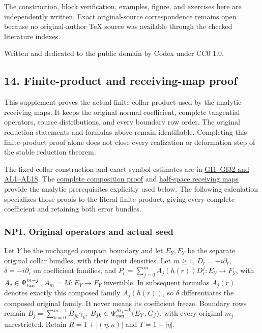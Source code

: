 \documentclass[
  11pt,
]{article}
\begin{document}
The construction, block verification, examples, figure, and exercises
here are independently written. Exact original-source correspondence
remains open because no original-author TeX source was available through
the checked literature indexes.

Written and dedicated to the public domain by Codex under CC0 1.0.

\subsection{14. Finite-product and receiving-map
proof}\label{finite-product-receiving-proof}

This supplement proves the actual finite collar product used by the
analytic receiving maps. It keeps the original normal coefficient,
complete tangential operators, source distributions, and every boundary
row order. The original reduction statements and formulas above remain
identifiable. Completing this finite-product proof alone does not close
every realization or deformation step of the stable reduction theorem.

The fixed-collar construction and exact symbol estimates are in
\href{generalized-collar-fredholm.pdf\#section*.90}{GI1--GI32
and AL1--AL18}. The
\href{generalized-collar-fredholm.pdf\#section*.208}{complete
composition proof} and
\href{generalized-collar-fredholm.pdf\#section*.249}{half-space
receiving maps} provide the analytic prerequisites explicitly used
below. The following calculation specializes those proofs to the literal
finite product, giving every complete coefficient and retaining both
error bundles.

\subsubsection{NP1. Original operators and actual
seed}\label{np1.-original-operators-and-actual-seed}

Let \(Y\) be the unchanged compact boundary and let \(E_Y,F_Y\) be the
separate original collar bundles, with their input densities. Let
\(m\ge 1\), \(D_r=-i\partial _r\), \(\delta =-i\partial _r\) on
coefficient families, and
\(P_c=\sum _{j=0}^m A_j(h(r))D_r^j:E_Y\to F_Y\), with
\(A_j\in \Psi _{\rm tan}^{m-j}\), \(A_m=M:E_Y\to F_Y\) invertible. In
subsequent formulas \(A_j(r)\) denotes exactly this composed family
\(A_j(h(r))\), so \(\delta \) differentiates the composed original
family. It never means its coefficient freeze. Boundary rows remain
\(B_j=\sum _{k=0}^{m-1}B_{jk}\gamma _k\),
\(B_{jk}\in \Psi _{\rm tan}^{m_j-k}(E_Y,G_j)\), with every original
\(m_j\) unrestricted. Retain \(R=1+|(\eta ,\kappa )|\) and
\(T=1+|\eta |\).
\end{document}
